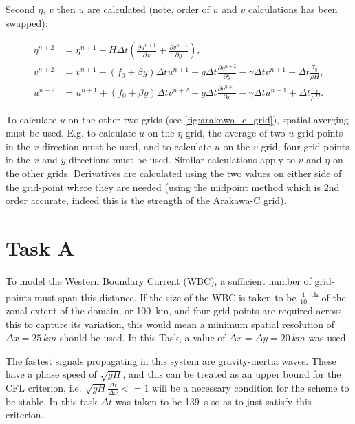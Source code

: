 \documentclass{article}
\newcommand{\ts}{\textsuperscript}
\begin{document}
Second $\eta$, $v$ then $u$ are calculated (note, order of $u$ and $v$ calculations has been
swapped):

\begin{align}
    \label{eqn:swe_arakawa4} 
    \eta^{n+2} & =  \eta^{n+1}- H \Delta t (\frac{\partial u^{n+1}}{\partial x} + \frac{\partial
    v^{n+1}}{\partial y} ),  \\
    \label{eqn:swe_arakawa5} 
    v^{n+2} & = v^{n+1} - (f_0 + \beta y) \Delta t u^{n+1} - g \Delta t \frac{\partial \eta^{n+2}}{\partial y} -
    \gamma \Delta t v^{n+1} + \Delta t \frac{\tau_y}{\rho H}, \\
    \label{eqn:swe_arakawa6} 
    u^{n+2} & = u^{n+1} + (f_0 + \beta y) \Delta t v^{n+2} - g \Delta t \frac{\partial
	\eta^{n+1}}{\partial x} - \gamma \Delta t u^{n+1} + \Delta t \frac{\tau_x}{\rho H}.
\end{align}

To calculate $u$ on the other two grids (see \ref{fig:arakawa_c_grid}), spatial averging must
be used. E.g. to calculate $u$ on the $\eta$ grid, the average of two $u$ grid-points in the $x$
direction must be used, and to calculate $u$ on the $v$ grid, four grid-points in the $x$ and $y$
directions must be used. Similar calculations apply to $v$ and $\eta$ on the other grids.
Derivatives are calculated using the two values on either side of the grid-point where they are
needed (using the midpoint method which is 2nd order accurate, indeed this is the strength of the
Arakawa-C grid).

\section*{Task A}

To model the Western Boundary Current (WBC), a sufficient number of grid-points must span this
distance. If the size of the WBC is taken to be $\frac{1}{10}$ \ts{th} of the zonal extent of the
domain, or \SI{100}{km}, and four grid-points are required across this to capture its variation,
this would mean a minimum spatial resolution of $\Delta x = 25\, km$ should be used. In this Task,
a value of $\Delta x = \Delta y = 20\, km$ was used.

The fastest signals propagating in this system are gravity-inertia waves. These have a phase speed
of $\sqrt{g H}$, and this can be treated as an upper bound for the CFL criterion, i.e. $\sqrt{g H}
\frac{\Delta t}{\Delta x} <= 1$ will be a necessary condition for the scheme to be stable. In this
task $\Delta t$ was taken to be \SI{139}{s} so as to just satisfy this criterion.
\end{document}
